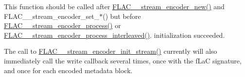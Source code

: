 This function should be called after \hyperlink{group__flac__stream__encoder_ga35f3d94452bcf0a90a31c7d770b200bc}{F\+L\+A\+C\+\_\+\+\_\+stream\+\_\+encoder\+\_\+new()} and F\+L\+A\+C\+\_\+\+\_\+stream\+\_\+encoder\+\_\+set\+\_\+$\ast$() but before \hyperlink{group__flac__stream__encoder_gae187ec4f6cab3ca109637996ee23272d}{F\+L\+A\+C\+\_\+\+\_\+stream\+\_\+encoder\+\_\+process()} or \hyperlink{group__flac__stream__encoder_ga67c2ff5b23b945180797de420b1f27c0}{F\+L\+A\+C\+\_\+\+\_\+stream\+\_\+encoder\+\_\+process\+\_\+interleaved()}. initialization succeeded.

The call to \hyperlink{group__flac__stream__encoder_ga85221c4ceb9f22dfd4983d8f07a9a35b}{F\+L\+A\+C\+\_\+\+\_\+stream\+\_\+encoder\+\_\+init\+\_\+stream()} currently will also immediately call the write callback several times, once with the {\ttfamily f\+LaC} signature, and once for each encoded metadata block.


